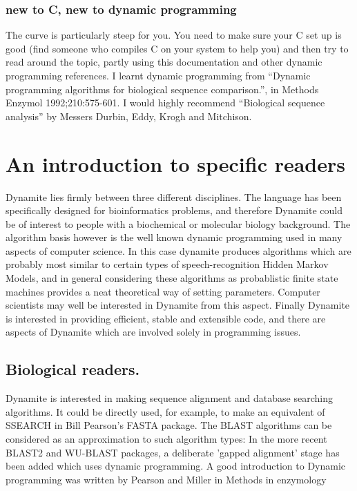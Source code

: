 \subsubsection{new to C, new to dynamic programming}
The curve is particularly steep for you. You need to make sure your C
set up is good (find someone who compiles C on your system to help
you) and then try to read around the topic, partly using this
documentation and other dynamic programming references. I learnt
dynamic programming from ``Dynamic programming algorithms for
biological sequence comparison.'', in Methods Enzymol
1992;210:575-601. I would highly recommend ``Biological sequence
analysis'' by Messers Durbin, Eddy, Krogh and Mitchison.


 
\section{An introduction to specific readers}
Dynamite lies firmly between three different disciplines. The
language has been specifically designed for bioinformatics problems,
and therefore Dynamite could be of interest to people with a 
biochemical or molecular biology background. The algorithm basis however
is the well known dynamic programming used in many aspects of computer
science. In this case dynamite produces algorithms which are probably
most similar to certain types of speech-recognition Hidden Markov Models, and
in general considering these algorithms as probablistic finite state machines
provides a neat theoretical way of setting parameters. Computer scientists
may well be interested in Dynamite from this aspect. Finally Dynamite is
interested in providing efficient, stable and extensible code, and there are
aspects of Dynamite which are involved solely in programming issues.

\subsection{Biological readers.}
Dynamite is interested in making sequence alignment and database searching
algorithms. It could be directly used, for example, to make an equivalent
of SSEARCH in Bill Pearson's FASTA package. The BLAST algorithms can be
considered as an approximation to such algorithm types: In the more recent
BLAST2 and WU-BLAST packages, a deliberate 'gapped alignment' stage has
been added which uses dynamic programming. A good introduction to Dynamic
programming was written by Pearson and Miller in Methods in enzymology


